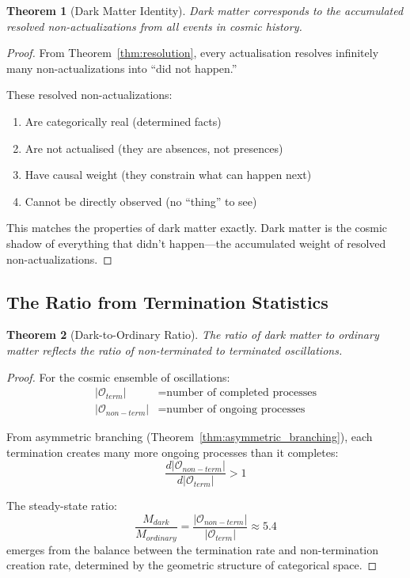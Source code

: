 \documentclass[12pt,a4paper]{article}
\newtheorem{theorem}{Theorem}[section]
\theoremstyle{definition}
\theoremstyle{remark}
\begin{document}
\begin{theorem}[Dark Matter Identity]
\label{thm:dark_matter_identity}
Dark matter corresponds to the accumulated resolved non-actualizations from all events in cosmic history.
\end{theorem}

\begin{proof}
From Theorem~\ref{thm:resolution}, every actualisation resolves infinitely many non-actualizations into ``did not happen.''

These resolved non-actualizations:
\begin{enumerate}
    \item Are categorically real (determined facts)
    \item Are not actualised (they are absences, not presences)
    \item Have causal weight (they constrain what can happen next)
    \item Cannot be directly observed (no ``thing'' to see)
\end{enumerate}

This matches the properties of dark matter exactly. Dark matter is the cosmic shadow of everything that didn't happen—the accumulated weight of resolved non-actualizations.
\end{proof}

\subsection{The Ratio from Termination Statistics}

\begin{theorem}[Dark-to-Ordinary Ratio]
\label{thm:termination_ratio}
The ratio of dark matter to ordinary matter reflects the ratio of non-terminated to terminated oscillations.
\end{theorem}

\begin{proof}
For the cosmic ensemble of oscillations:
\begin{align}
|\mathcal{O}_{term}| &= \text{number of completed processes} \\
|\mathcal{O}_{non-term}| &= \text{number of ongoing processes}
\end{align}

From asymmetric branching (Theorem~\ref{thm:asymmetric_branching}), each termination creates many more ongoing processes than it completes:
\begin{equation}
\frac{d|\mathcal{O}_{non-term}|}{d|\mathcal{O}_{term}|} > 1
\end{equation}

The steady-state ratio:
\begin{equation}
\frac{M_{dark}}{M_{ordinary}} = \frac{|\mathcal{O}_{non-term}|}{|\mathcal{O}_{term}|} \approx 5.4
\end{equation}
emerges from the balance between the termination rate and non-termination creation rate, determined by the geometric structure of categorical space.
\end{proof}
\end{document}
